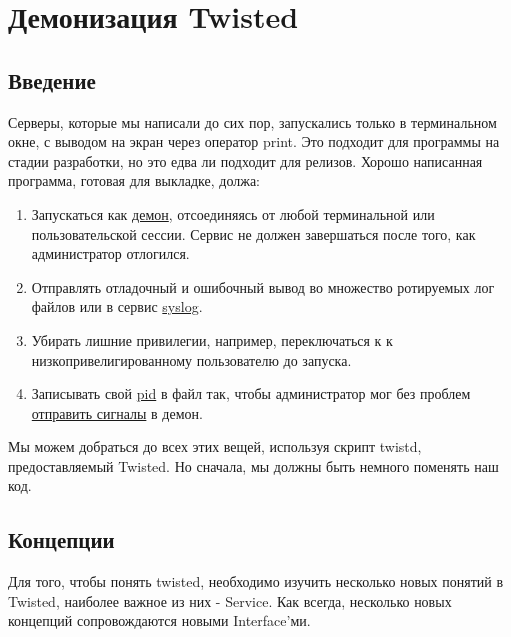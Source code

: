 
\section{Демонизация Twisted\label{sec:part16}}

\subsection{Введение}


Серверы, которые мы написали до сих пор, запускались только 
в терминальном окне, с выводом на экран через оператор 
print. Это подходит для программы на стадии разработки, но 
это едва ли подходит для релизов. Хорошо написанная программа, 
готовая для выкладке, должа:

\begin{enumerate}

\item Запускаться как 
\href{http://en.wikipedia.org/wiki/Daemon\_%28computer_software%29}{демон}, отсоединяясь от 
любой терминальной или пользовательской сессии. Сервис 
не должен завершаться после того, как 
администратор отлогился.

\item Отправлять отладочный и ошибочный вывод во 
множество ротируемых лог файлов или в сервис 
\href{http://en.wikipedia.org/wiki/Syslog}{syslog}.

\item Убирать лишние привилегии, например, переключаться к 
к низкопривелигированному пользователю до запуска.

\item Записывать свой 
\href{http://en.wikipedia.org/wiki/Process\_ID}{pid} в файл так, чтобы администратор 
мог без проблем 
\href{http://en.wikipedia.org/wiki/Kill%28%29}{отправить сигналы} в демон.

\end{enumerate}


Мы можем добраться до всех этих вещей, 
используя скрипт twistd, предоставляемый Twisted. Но сначала, 
мы должны быть немного поменять наш код.


\subsection{Концепции}

Для того, чтобы понять twisted, необходимо изучить несколько 
новых понятий в Twisted, наиболее важное из них - Service. Как всегда, 
несколько новых концепций сопровождаются новыми Interface'ми.

